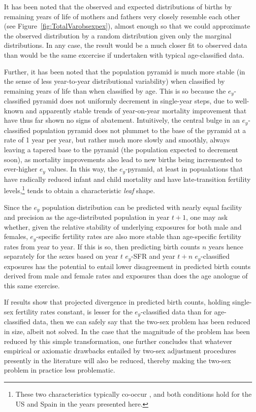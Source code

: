  \FloatBarrier
\label{sec:exdivergence}
It has been noted that the observed and expected distributions of births by
remaining years of life of mothers and fathers very closely resemble each other
(see Figure~\ref{fig:TotalVarobsexpex}), almost enough so that we could
approximate the observed distribution by a random distribution given only the
marginal distributions. In any case, the result would be a much closer fit to
observed data than would be the same excercise if undertaken with typical
age-classified data. 

Further, it has been noted that the population pyramid is
much more stable (in the sense of less year-to-year
distributional variability) when classified by remaining years
of life than when classified by age. This is so because the $e_y$-classified 
pyramid does not uniformly decrement in single-year steps, due
to well-known and apparently stable trends of year-on-year mortality improvement
that have thus far shown no signs of abatement. Intuitively, the central bulge
in an $e_y$-classified population pyramid does not plummet to the base of the 
pyramid at a rate of 1
year per year, but rather much more slowly and smoothly, always leaving a
tapered base to the pyramid (the population expected to decrement soon), as
mortality improvements also lead to new births being incremented to ever-higher
$e_y$ values. In this way, the $e_y$-pyramid, at least in popualations that have
radically reduced infant and child mortality and have late-transition fertility 
levels,\footnote{These two characteristics typically co-occur
\citep{macinnes2009reproductive}, and both conditions hold for the US and Spain
in the years presented here.} tends to obtain a characteristic \textit{leaf}
shape.

Since the $e_y$ population distribution can be predicted
with nearly equal facility and precision as the age-distributed population in
year $t+1$, one may ask whether, given the relative stability of underlying
exposures for both male and females, $e_y$-specific fertility rates are 
also more stable than
age-specific fertility rates from year to year. If this is so, then predicting 
birth counts $n$ years hence separately for the sexes based
on year $t$ $e_y$-SFR and year $t + n$ $e_y$-classified exposures has the
potential to entail lower disagreement in predicted birth counts derived
from male and female rates and exposures than does the age
anologue of this same exercise.

If results show that projected divergence in predicted birth counts, holding
single-sex fertility rates constant, is lesser for the $e_y$-classified data
than for age-classified data, then we can safely say that the two-sex problem
has been reduced in size, albeit not solved. In the case that the magnitude of
the problem has been reduced by this simple transformation, one further
concludes that whatever empirical or axiomatic drawbacks entailed by 
two-sex adjustment procedures presently in the literature will also be reduced,
thereby making the two-sex problem in practice less problematic. 

